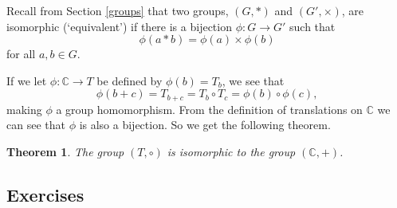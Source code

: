\documentclass[
]{book}
\newtheorem{theorem}{Theorem}[chapter]
\theoremstyle{definition}
\theoremstyle{definition}
\theoremstyle{definition}
\theoremstyle{definition}
\theoremstyle{remark}
\begin{document}
Recall from Section \ref{groups} that two groups, \((G,*)\) and \((G',\times)\), are isomorphic (`equivalent') if there is a bijection \(\phi: G \rightarrow G'\) such that
\[\phi(a*b) = \phi(a)\times \phi(b)\]
for all \(a,b\in G\).

If we let \(\phi:\mathbb{C} \rightarrow T\) be defined by \(\phi(b)=T_b\), we see that \[\phi(b+c) = T_{b+c} = T_b \circ T_c = \phi(b) \circ \phi(c),\] making \(\phi\) a group homomorphism. From the definition of translations on \(\mathbb{C}\) we can see that \(\phi\) is also a bijection. So we get the following theorem.

\begin{theorem}
The group \((T,\circ)\) is isomorphic to the group \((\mathbb{C},+)\).
\end{theorem}

\hypertarget{exercises-53}{%
\subsection{Exercises}\label{exercises-53}}
\end{document}
